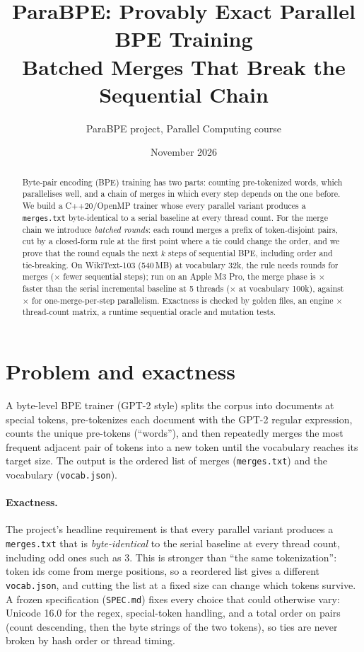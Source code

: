 \documentclass[11pt,a4paper]{article}
\title{ParaBPE: Provably Exact Parallel BPE Training\\[2pt]
  \large Batched Merges That Break the Sequential Chain}
\author{ParaBPE project, Parallel Computing course}
\date{November 2026}
\newcommand{\code}[1]{\texttt{#1}}
\newcommand{\x}{$\times$}
\begin{document}
\maketitle

\begin{abstract}
Byte-pair encoding (BPE) training has two parts: counting pre-tokenized words, which parallelises well, and a chain of
merges in which every step depends on the one before. We build a C++20/OpenMP trainer whose every parallel variant
produces a \code{merges.txt} byte-identical to a serial baseline at every thread count. For the merge chain we introduce
\emph{batched rounds}: each round merges a prefix of token-disjoint pairs, cut by a closed-form rule at the first point
where a tie could change the order, and we prove that the round equals the next $k$ steps of sequential BPE, including
order and tie-breaking. On WikiText-103 (540\,MB) at vocabulary 32k, the rule needs \wtRounds{} rounds for \wtMerges{}
merges (\wtSpan\x{} fewer sequential steps); run on an Apple M3 Pro, the merge phase is \wtBatchFive\x{} faster than the
serial incremental baseline at 5 threads (\wtBatchFiveC\x{} at vocabulary 100k), against \wtParFive\x{} for one-merge-per-step
parallelism. Exactness is checked by golden files, an engine $\times$ thread-count matrix, a runtime sequential oracle
and mutation tests.
\end{abstract}

\section{Problem and exactness}

A byte-level BPE trainer (GPT-2 style) splits the corpus into documents at special tokens, pre-tokenizes each document
with the GPT-2 regular expression, counts the unique pre-tokens (``words''), and then repeatedly merges the most frequent
adjacent pair of tokens into a new token until the vocabulary reaches its target size. The output is the ordered list of
merges (\code{merges.txt}) and the vocabulary (\code{vocab.json}).

\paragraph{Exactness.} The project's headline requirement is that every parallel variant produces a \code{merges.txt} that
is \emph{byte-identical} to the serial baseline at every thread count, including odd ones such as 3. This is stronger than
``the same tokenization'': token ids come from merge positions, so a reordered list gives a different \code{vocab.json},
and cutting the list at a fixed size can change which tokens survive. A frozen specification (\code{SPEC.md}) fixes every
choice that could otherwise vary: Unicode 16.0 for the regex, special-token handling, and a total order on pairs (count
descending, then the byte strings of the two tokens), so ties are never broken by hash order or thread timing.
\end{document}
